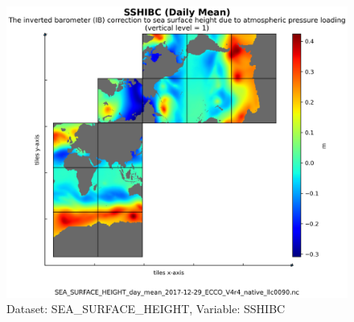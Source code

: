 \begin{figure}[H]
\centering
\includegraphics[scale=0.55]{../images/plots/native_plots/Sea_Surface_Height/SSHIBC.png}
\caption{Dataset: SEA\_SURFACE\_HEIGHT, Variable: SSHIBC}
\label{tab:table-SEA_SURFACE_HEIGHT_SSHIBC-Plot}
\end{figure}
\newpage
\pagebreak
